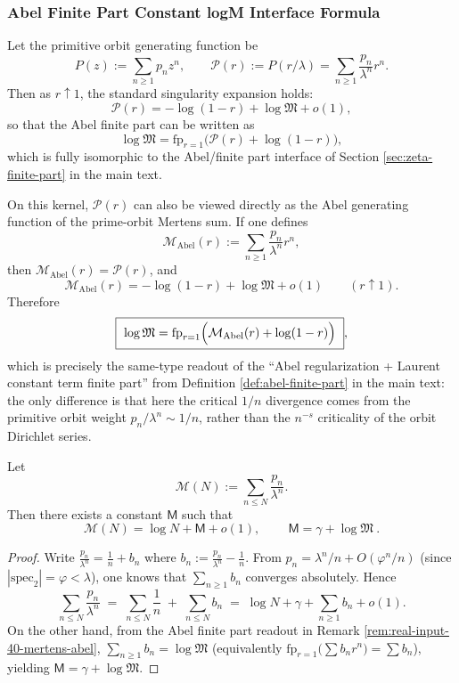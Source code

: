 \subsubsection{Abel Finite Part Constant logM Interface Formula}\label{app:real-input-40-finite-part}
Let the primitive orbit generating function be
\[
P(z):=\sum_{n\ge 1}p_n z^n,
\qquad
\mathcal{P}(r):=P(r/\lambda)=\sum_{n\ge 1}\frac{p_n}{\lambda^n}r^n.
\]
Then as $r\uparrow 1$, the standard singularity expansion holds:
\[
\mathcal{P}(r)=-\log(1-r)+\log\mathfrak{M}+o(1),
\]
so that the Abel finite part can be written as
\[
\log\mathfrak{M}=\mathrm{fp}_{r=1}\bigl(\mathcal{P}(r)+\log(1-r)\bigr),
\]
which is fully isomorphic to the Abel/finite part interface of Section \ref{sec:zeta-finite-part} in the main text.

\begin{remark}\label{rem:real-input-40-mertens-abel}
On this kernel, $\mathcal{P}(r)$ can also be viewed directly as the Abel generating function of the prime-orbit Mertens sum. If one defines
\[
\mathcal{M}_{\mathrm{Abel}}(r):=\sum_{n\ge 1}\frac{p_n}{\lambda^n}r^n,
\]
then $\mathcal{M}_{\mathrm{Abel}}(r)=\mathcal{P}(r)$, and
\[
\mathcal{M}_{\mathrm{Abel}}(r)=-\log(1-r)+\log\mathfrak{M}+o(1)\qquad(r\uparrow 1).
\]
Therefore
\[
\boxed{\ \log\mathfrak{M}=\mathrm{fp}_{r=1}\Bigl(\mathcal{M}_{\mathrm{Abel}}(r)+\log(1-r)\Bigr)\ },
\]
which is precisely the same-type readout of the ``Abel regularization + Laurent constant term finite part'' from Definition \ref{def:abel-finite-part} in the main text: the only difference is that here the critical $1/n$ divergence comes from the primitive orbit weight $p_n/\lambda^n\sim 1/n$, rather than the $n^{-s}$ criticality of the orbit Dirichlet series.
\end{remark}

\begin{corollary}\label{cor:real-input-40-Mertens-constant}
Let
\[
\mathcal{M}(N):=\sum_{n\le N}\frac{p_n}{\lambda^n}.
\]
Then there exists a constant $\mathsf{M}$ such that
\[
\mathcal{M}(N)=\log N+\mathsf{M}+o(1),
\qquad
\boxed{\ \mathsf{M}=\gamma+\log\mathfrak{M}\ }.
\]
\end{corollary}

\begin{proof}
Write
\(
\frac{p_n}{\lambda^n}=\frac{1}{n}+b_n
\)
where $b_n:=\frac{p_n}{\lambda^n}-\frac{1}{n}$. From $p_n=\lambda^n/n+O(\varphi^n/n)$ (since $|\mathrm{spec}_2|=\varphi<\lambda$), one knows that $\sum_{n\ge 1}b_n$ converges absolutely.
Hence
\[
\sum_{n\le N}\frac{p_n}{\lambda^n}
\;=\;
\sum_{n\le N}\frac{1}{n}
\;+\;
\sum_{n\le N}b_n
\;=\;
\log N+\gamma+\sum_{n\ge 1}b_n+o(1).
\]
On the other hand, from the Abel finite part readout in Remark \ref{rem:real-input-40-mertens-abel},
\(
\sum_{n\ge 1}b_n=\log\mathfrak{M}
\)
(equivalently $\mathrm{fp}_{r=1}\bigl(\sum b_n r^n\bigr)=\sum b_n$), yielding $\mathsf{M}=\gamma+\log\mathfrak{M}$.
\end{proof}

